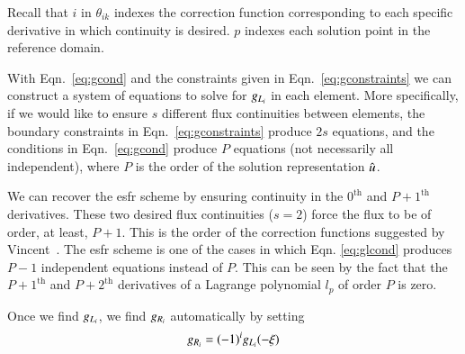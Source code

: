 Recall that $i$ in $\theta_{ik}$ indexes the correction function corresponding to each specific derivative in which continuity is desired. $p$ indexes each solution point in the reference domain.

With Eqn.~\eqref{eq:gcond} and the constraints given in Eqn.~\eqref{eq:gconstraints} we can
construct a system of equations to solve for ${g_{L_i}}$ in each element. More specifically, if we
would like to ensure $s$ different flux continuities between elements, the boundary constraints in
Eqn.~\eqref{eq:gconstraints} produce $2s$ equations, and the conditions in
Eqn.~\eqref{eq:gcond} produce $P$ equations (not necessarily all independent), where $P$ is the order of the solution
representation $\hat{u}$. %

We can recover the \gls{esfr} scheme by
ensuring continuity in the $0^\text{th}$ and $P+1^\text{th}$ derivatives. These two desired
flux continuities ($s=2$) force the flux to be of order, at least, $P+1$. This is the order of the correction functions suggested by Vincent~\cite{vincent2011new}. The \gls{esfr} scheme is one of the cases in which Eqn. \eqref{eq:glcond} produces $P-1$ independent equations instead of $P$. This can be seen by the fact that the $P+1^\text{th}$ and  $P+2^\text{th}$ derivatives of a Lagrange polynomial $l_p$ of order $P$ is zero.

Once we find ${g_{L_i}}$, we find ${g_{R_i}}$ automatically by setting 
\begin{equation}\label{eq:gr_gl_cond}
 {g_{R_i}} = (-1)^i{g_{L_i}}(-\xi)
\end{equation}
